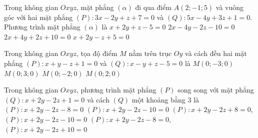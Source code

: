 \begin{ex}%
Trong không gian $Oxyz$, mặt phẳng $(\alpha)$ đi qua điểm $A(2 ;-1 ; 5)$ và vuông góc với hai mặt phẳng $(P)\colon  3 x-2 y+z+7=0$ và $(Q)\colon  5 x-4 y+3 z+1=0$. Phương trình mặt phẳng $(\alpha)$ là
\choice
{\True $x+2 y+z-5=0$}
{$2 x-4 y-2 z-10=0$}
{$2 x+4 y+2 z+10=0$}
{$x+2 y-z+5=0$}
\end{ex}

\begin{ex}%
Trong không gian $Oxyz$, tọa độ điểm $M$ nằm trên trục $O y$ và cách đều hai mặt phẳng $(P)\colon  x+y-z+1=0$ và $(Q)\colon  x-y+z-5=0$ là
\choice
{\True $M(0 ;-3 ; 0)$}
{$M(0 ; 3 ; 0)$}
{$M(0 ;-2 ; 0)$}
{$M(0 ; 2 ; 0)$}
\end{ex}

\begin{ex}%
Trong không gian $O x y z$, phương trình mặt phẳng $(P)$ song song với mặt phẳng $(Q)\colon  x+2 y-2 z+1=0$ và cách $(Q)$ một khoảng bằng $3$ là
\choice
{$(P)\colon  x+2 y-2 z-8=0$}
{$(P)\colon  x+2 y-2 z-10=0$}
{$(P)\colon  x+2 y-2 z+8=0$, $(P)\colon  x+2 y-2 z-10=0$}
{\True $(P)\colon  x+2 y-2 z-8=0$, $(P)\colon  x+2 y-2 z+10=0$}
\end{ex}


